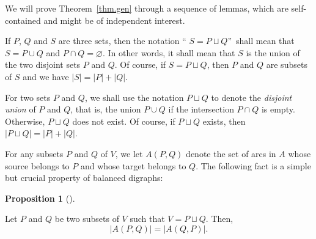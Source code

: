 \documentclass[numbers=enddot,12pt,final,onecolumn,notitlepage]{scrartcl}%
\theoremstyle{definition}
\newtheorem{prop}[theo]{Proposition}
\newenvironment{proposition}[1][]
{\begin{prop}[#1]\begin{leftbar}}
{\end{leftbar}\end{prop}}
\newenvironment{noncompile}{}{}
\theoremstyle{plainsl}
\begin{document}
We will prove Theorem~\ref{thm.gen} through a sequence of lemmas, which are
self-contained and might be of independent interest.

If $P$, $Q$ and $S$ are three sets, then the notation \textquotedblleft%
$S=P\sqcup Q$\textquotedblright\ shall mean that $S=P\cup Q$ and $P\cap
Q=\varnothing$. In other words, it shall mean that $S$ is the union of the two
disjoint sets $P$ and $Q$. Of course, if $S=P\sqcup Q$, then $P$ and $Q$ are
subsets of $S$ and we have $\left\vert S\right\vert =\left\vert P\right\vert
+\left\vert Q\right\vert $.

\begin{noncompile}
For two sets $P$ and $Q$, we shall use the notation $P\sqcup Q$ to denote the
\emph{disjoint union} of $P$ and $Q$, that is, the union $P\cup Q$ if the
intersection $P\cap Q$ is empty. Otherwise, $P\sqcup Q$ does not exist. Of
course, if $P\sqcup Q$ exists, then $\left\vert P\sqcup Q\right\vert
=\left\vert P\right\vert +\left\vert Q\right\vert $.
\end{noncompile}

For any subsets $P$ and $Q$ of $V$, we let $A(P,Q)$ denote the set of arcs in
$A$ whose source belongs to $P$ and whose target belongs to $Q$. The following
fact is a simple but crucial property of balanced digraphs:

\begin{proposition}
\label{prop.A-symmetry}Let $P$ and $Q$ be two subsets of $V$ such that
$V=P\sqcup Q$. Then,
\[
\left\vert A\left(  P,Q\right)  \right\vert =\left\vert A\left(  Q,P\right)
\right\vert .
\]

\end{proposition}
\end{document}
